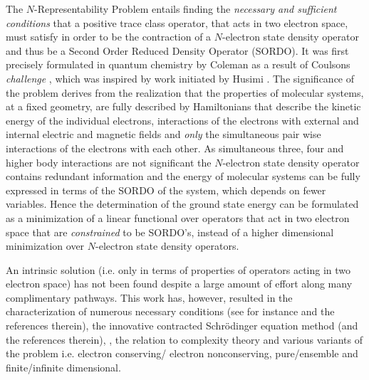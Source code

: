 \documentclass[aps,preprint]{revtex4}%
\begin{document}
The $N$-Representability Problem entails finding the \emph{necessary and
sufficient conditions} that a positive trace class operator, that acts in two
electron space, must satisfy in order to be the contraction of a $N$-electron
state density operator and thus be a Second Order Reduced Density Operator
(SORDO). It was first precisely formulated in quantum chemistry by Coleman
\cite{Coleman63} as a result of Coulsons \emph{challenge }\cite{Coleman2000},
which was inspired by work initiated by Husimi \cite{Husimi}. The significance
of the problem derives from the realization that the properties of molecular
systems, at a fixed geometry, are fully described by Hamiltonians that
describe the kinetic energy of the individual electrons, interactions of the
electrons with external and internal electric and magnetic fields and
\emph{only }the simultaneous pair wise interactions of the electrons with each
other. As simultaneous three, four and higher body interactions are not
significant the $N$-electron state density operator contains redundant
information and the energy of molecular systems can be fully expressed in
terms of the SORDO of the system, which depends on fewer variables. Hence the
determination of the ground state energy can be formulated as a minimization
of a linear functional over operators that act in two electron space that are
\emph{constrained} to be SORDO's, instead of a higher dimensional minimization
over $N$-electron state density operators.

An intrinsic solution (i.e. only in terms of properties of operators acting in
two electron space) has not been found despite a large amount of effort
\cite{Mazziotti2007} along many complimentary pathways. This work has,
however, resulted in the characterization of numerous necessary conditions
(see for instance \cite{Mazziotti2007} and the references therein), the
innovative contracted Schr\"{o}dinger equation method \cite{Mazziotti} (and
the references therein), \cite{Valdemoro}, the relation to complexity theory
\cite{NPhard} and various variants of the problem i.e. electron conserving/
electron nonconserving, pure/ensemble and finite/infinite dimensional.
\end{document}
